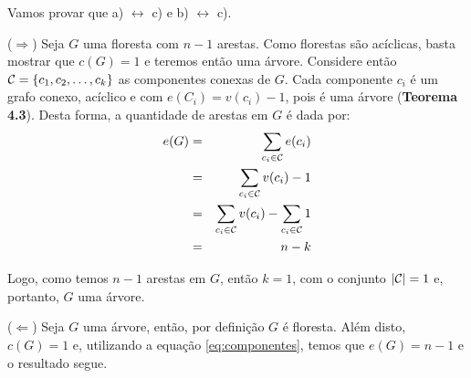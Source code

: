 
Vamos provar que a) $\leftrightarrow$ c) e b) $\leftrightarrow$ c).


($\Rightarrow$) Seja $G$ uma floresta com $n-1$ arestas.
%
Como florestas são acíclicas, basta mostrar que $c(G) = 1$ e teremos então uma árvore. 
%
Considere então ${\cal C} = \{c_1, c_2, \ldots, c_k\}$ as componentes conexas de $G$.
%
Cada componente $c_i$ é um grafo conexo, acíclico e com $e(C_i) = v(c_i) - 1$, pois é uma árvore ({\bf Teorema 4.3}).
%
Desta forma, a quantidade de arestas em $G$ é dada por:
\begin{eqnarray}
	e(G) &=& \sum_{c_i \in {\cal C}} e(c_i)      \nonumber \\
	     &=& \sum_{c_i \in {\cal C}} v(c_i) - 1  \nonumber \\
	     &=& \sum_{c_i \in {\cal C}} v(c_i) - \sum_{c_i \in {\cal C}} 1 \nonumber \\
	     &=& n - k \label{eq:componentes}
\end{eqnarray}

Logo, como temos $n-1$ arestas em $G$, então $k = 1$, com o conjunto $|{\cal C}| = 1$ e, portanto, $G$ uma árvore.

($\Leftarrow$) Seja $G$ uma árvore, então, por definição $G$ é floresta. Além disto, $c(G) = 1$ e, utilizando a equação \ref{eq:componentes}, temos que $e(G) = n - 1$ e o resultado segue.
\fimprova

